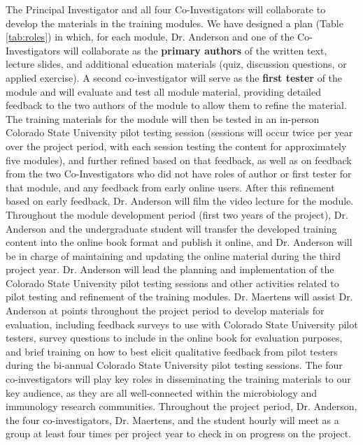 \documentclass[pdftex,english,11.5pt,parskip=half]{scrartcl}
\begin{document}
The Principal Investigator and all four Co-Investigators will collaborate to 
develop the materials in the training modules. We have designed a plan (Table \ref*{tab:roles}) in which, for each module, Dr. Anderson and one of the Co-Investigators will collaborate as the \textbf{primary authors} of the written text, lecture slides, and additional education materials (quiz, discussion questions, or applied exercise). A second co-investigator will serve as the \textbf{first tester} of the module and will evaluate and test all module material, providing detailed feedback to the two authors of the module to allow them to refine the material. The training materials for the module will then be tested in an in-person Colorado State University pilot testing session (sessions will occur twice per year over the project period, with each session testing the content for approximately five modules), and further refined based on that feedback, as well as on feedback from the two Co-Investigators who did not have roles of author or first tester for that module, and any feedback from early online users. After this refinement based on early feedback, Dr. Anderson will film the video lecture for the module.  
Throughout the module development period (first two years of the project), Dr. Anderson and the undergraduate student will transfer the developed training content into the online book format and publish it online, and Dr. Anderson will be in charge of maintaining and updating the online material during the third project year. Dr. Anderson will lead the planning and implementation of the Colorado State University pilot testing sessions and other activities related to pilot testing and refinement of the training modules. Dr. Maertens will assist Dr. Anderson at points throughout the project period to develop materials for evaluation, including feedback surveys to use with Colorado State University pilot testers, survey questions to include in the online book for evaluation purposes, and brief training on how to best elicit qualitative feedback from pilot testers during the bi-annual Colorado State University pilot testing sessions. The four co-investigators will play key roles in disseminating the training materials to our key audience, as they are all well-connected within the microbiology and immunology research communities. Throughout the project period, Dr. Anderson, the four co-investigators, Dr. Maertens, and the student hourly will meet as a group at least four times per project year to check in on progress on the project. 
\end{document}
